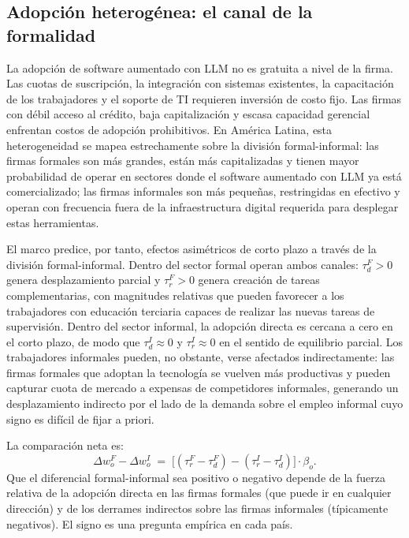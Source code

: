\subsection{Adopción heterogénea: el canal de la formalidad}
\label{subsec:theory_formality}

La adopción de software aumentado con LLM no es gratuita a nivel de la firma. Las cuotas de suscripción, la integración con sistemas existentes, la capacitación de los trabajadores y el soporte de TI requieren inversión de costo fijo. Las firmas con débil acceso al crédito, baja capitalización y escasa capacidad gerencial enfrentan costos de adopción prohibitivos. En América Latina, esta heterogeneidad se mapea estrechamente sobre la división formal-informal: las firmas formales son más grandes, están más capitalizadas y tienen mayor probabilidad de operar en sectores donde el software aumentado con LLM ya está comercializado; las firmas informales son más pequeñas, restringidas en efectivo y operan con frecuencia fuera de la infraestructura digital requerida para desplegar estas herramientas.

El marco predice, por tanto, efectos asimétricos de corto plazo a través de la división formal-informal. Dentro del sector formal operan ambos canales: $\tau_d^F > 0$ genera desplazamiento parcial y $\tau_r^F > 0$ genera creación de tareas complementarias, con magnitudes relativas que pueden favorecer a los trabajadores con educación terciaria capaces de realizar las nuevas tareas de supervisión. Dentro del sector informal, la adopción directa es cercana a cero en el corto plazo, de modo que $\tau_d^I \approx 0$ y $\tau_r^I \approx 0$ en el sentido de equilibrio parcial. Los trabajadores informales pueden, no obstante, verse afectados indirectamente: las firmas formales que adoptan la tecnología se vuelven más productivas y pueden capturar cuota de mercado a expensas de competidores informales, generando un desplazamiento indirecto por el lado de la demanda sobre el empleo informal cuyo signo es difícil de fijar a priori.

La comparación neta es:
\begin{equation}
\Delta w_o^F - \Delta w_o^I \;=\; \bigl[(\tau_r^F - \tau_d^F) - (\tau_r^I - \tau_d^I)\bigr] \cdot \beta_o.
\label{eq:formal_informal}
\end{equation}
Que el diferencial formal-informal sea positivo o negativo depende de la fuerza relativa de la adopción directa en las firmas formales (que puede ir en cualquier dirección) y de los derrames indirectos sobre las firmas informales (típicamente negativos). El signo es una pregunta empírica en cada país.

